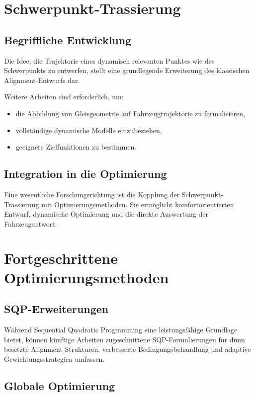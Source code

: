 \section{Schwerpunkt-Trassierung}

\subsection{Begriffliche Entwicklung}

Die Idee, die Trajektorie eines dynamisch relevanten Punktes wie des
Schwerpunkts zu entwerfen, stellt eine grundlegende Erweiterung des
klassischen Alignment-Entwurfs dar.

Weitere Arbeiten sind erforderlich, um:
\begin{itemize}
\item die Abbildung von Gleisgeometrie auf Fahrzeugtrajektorie zu formalisieren,
\item vollständige dynamische Modelle einzubeziehen,
\item geeignete Zielfunktionen zu bestimmen.
\end{itemize}

\subsection{Integration in die Optimierung}

Eine wesentliche Forschungsrichtung ist die Kopplung der
Schwerpunkt-Trassierung mit Optimierungsmethoden. Sie ermöglicht
komfortorientierten Entwurf, dynamische Optimierung und die direkte
Auswertung der Fahrzeugantwort.

\section{Fortgeschrittene Optimierungsmethoden}

\subsection{SQP-Erweiterungen}

Während Sequential Quadratic Programming eine leistungsfähige Grundlage
bietet, können künftige Arbeiten zugeschnittene SQP-Formulierungen für
dünn besetzte Alignment-Strukturen, verbesserte Bedingungsbehandlung und
adaptive Gewichtungsstrategien umfassen.

\subsection{Globale Optimierung}

